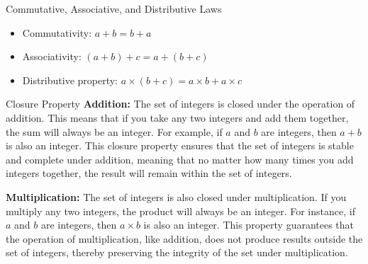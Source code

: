 
\begin{custombox}{{Commutative, Associative, and Distributive Laws}}


    \begin{itemize}
    \item Commutativity: $a+b=b+a$
    \item Associativity: $(a+b)+c=a+(b+c)$
    \item Distributive property: $a \times(b+c)=a \times b+a \times c$
    \end{itemize}
    
\end{custombox}

\begin{custombox}{Closure Property}
    \textbf{Addition:} The set of integers is closed under the operation of addition. This means that if you take any two integers and add them together, the sum will always be an integer. For example, if \(a\) and \(b\) are integers, then \(a + b\) is also an integer. This closure property ensures that the set of integers is stable and complete under addition, meaning that no matter how many times you add integers together, the result will remain within the set of integers.

\textbf{Multiplication:} The set of integers is also closed under multiplication. If you multiply any two integers, the product will always be an integer. For instance, if \(a\) and \(b\) are integers, then \(a \times b\) is also an integer. This property guarantees that the operation of multiplication, like addition, does not produce results outside the set of integers, thereby preserving the integrity of the set under multiplication.

\end{custombox}

